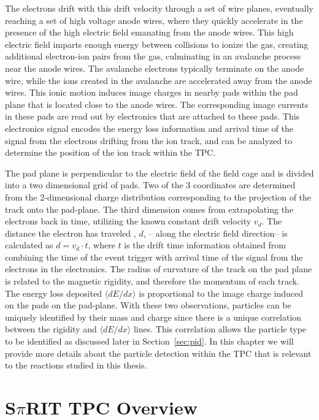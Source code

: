 The electrons drift with this drift velocity through a set of wire planes, eventually reaching a set of high voltage anode wires, where they quickly accelerate in the presence of the high electric field emanating from the anode wires. This high electric field imparts enough energy between collisions to ionize the gas, creating additional electron-ion pairs from the gas, culminating in an avalanche process near the anode wires. The avalanche electrons typically terminate on the anode wire,  while the ions created in the avalanche are accelerated  away from the anode wires. This ionic motion induces image charges in nearby pads within the pad plane that is located close to the anode wires. The corresponding image currents in these pads are read out by electronics that are attached to these pads. This electronics signal encodes the energy loss information and arrival time of the signal from the electrons drifting from the ion track, and can be analyzed to determine the position of the ion track within the TPC. 

The pad plane is perpendicular to the electric field of the field cage and is divided into a two dimensional grid of pads. Two of the 3 coordinates are determined from the 2-dimensional charge distribution corresponding to the projection of the track onto the pad-plane. The third dimension comes from extrapolating the electrons back in time, utilizing the known constant drift velocity $v_d$. The distance the electron has traveled , $d$, -- along the electric field direction-- is calculated as $d = v_d \cdot t$, where $t$ is the drift time information obtained from combining the time of the event trigger with arrival time of the signal from the  electrons in the electronics. The radius of curvature of the track on the pad plane is related to the magnetic rigidity, and therefore the momentum of each track. The energy loss deposited $\langle dE/dx\rangle$ is proportional to the image charge induced on the pads on the pad-plane. With these two observations, particles can be uniquely identified by their mass and charge since there is a unique correlation between the rigidity and $\langle dE/dx\rangle$  lines. This correlation allows the particle type to be identified as discussed later in Section~\ref{sec:pid}. In this chapter we will provide more details about the particle detection within the \spirit TPC  that is relevant to the reactions studied in this thesis. 


\section{S$\pi$RIT TPC Overview}

